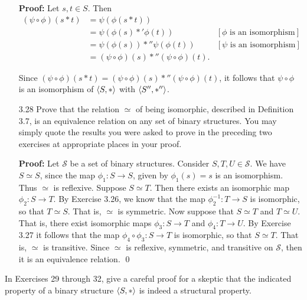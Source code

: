 \begin{enumerate}
      \textbf{Proof:} Let $s, t \in S$. Then \begin{align*}
         (\psi \circ \phi)(s * t) &= \psi(\phi(s * t)) \\
         &= \psi(\phi(s) *' \phi(t)) &[\phi\text{ is an isomorphism}] \\
         &= \psi(\phi(s)) *'' \psi(\phi(t)) &[\psi\text{ is an isomorphism}] \\
         &= (\psi\circ\phi)(s) *'' (\psi\circ\phi)(t).
      \end{align*}

      Since $(\psi \circ \phi)(s * t) = (\psi\circ\phi)(s) *''
      (\psi\circ\phi)(t)$, it follows that $\psi \circ \phi$ is an isomorphism 
      of  $\langle S, * \rangle$ with $\langle S'', *'' \rangle$.
   \item[3.28] Prove that the relation $\simeq$ of being isomorphic, described 
               in Definition 3.7, is an equivalence relation on any set of 
               binary structures. You may simply quote the results you were 
               asked to prove in the preceding two exercises at appropriate 
               places in your proof.

      \textbf{Proof:} Let $\mathcal{S}$ be a set of binary structures. Consider
      $S, T, U \in \mathcal{S}$. We have $S \simeq S$, since the map
      $\phi_1 : S \rightarrow S$, given by $\phi_1(s) = s$ is an isomorphism.
      Thus $\simeq$ is reflexive. Suppose $S \simeq T$. Then there exists an
      isomorphic map $\phi_2 : S \rightarrow T$. By Exercise 3.26, we know that
      the map $\phi_2^{-1} : T \rightarrow S$ is isomorphic, so that
      $T \simeq S$. That is, $\simeq$ is symmetric. Now suppose that
      $S \simeq T$ and $T \simeq U$. That is, there exist isomorphic maps
      $\phi_3 : S \rightarrow T$ and $\phi_4 : T \rightarrow U$. By Exercise 
      3.27 it follows that the map $\phi_4 \circ \phi_3 : S \rightarrow T$ is
      isomorphic, so that $S \simeq T$. That is, $\simeq$ is transitive. Since
      $\simeq$ is reflexive, symmetric, and transitive on $\mathcal{S}$, then it
      is an equivalence relation. \qed
\end{enumerate}

\noindent In Exercises 29 through 32, give a careful proof for a skeptic that
          the indicated property of a binary structure $\langle S, * \rangle$ is indeed a
          structural property.

